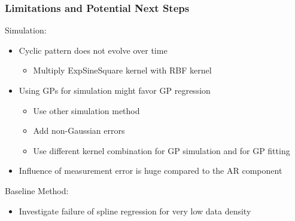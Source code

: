 \documentclass[
	8pt, %
]{beamer}
\begin{document}
\begin{frame}
	\frametitle{Limitations and Potential Next Steps}

	Simulation:
	\begin{itemize}
		\item Cyclic pattern does not evolve over time
		\begin{itemize}
			\item Multiply ExpSineSquare kernel with RBF kernel
		\end{itemize}
		\item Using GPs for simulation might favor GP regression
		\begin{itemize}
			\item Use other simulation method
			\item Add non-Gaussian errors
			\item Use different kernel combination for GP simulation and for
			GP fitting
		\end{itemize}
		\item Influence of measurement error is huge compared to the AR component
	\end{itemize}

	\bigskip

	Baseline Method:
	\begin{itemize}
		\item Investigate failure of spline regression for very low data density
	\end{itemize}

\end{frame}




%
%
\end{document}
